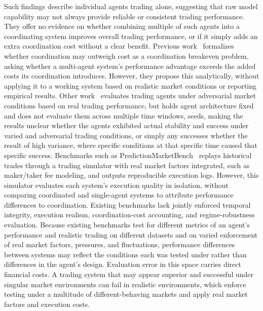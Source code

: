 \documentclass{article}
\begin{document}
Such findings describe individual agents trading alone, suggesting that raw model capability may not always provide reliable or consistent trading performance. They offer no evidence on whether combining multiple of such agents into a coordinating system improves overall trading performance, or if it simply adds an extra coordination cost without a clear benefit. Previous work~\cite{nguyen2026} formalizes whether coordination may outweigh cost as a coordination breakeven problem, asking whether a multi-agent system's performance advantage exceeds the added costs its coordination introduces. However, they propose this analytically, without applying it to a working system based on realistic market conditions or reporting empirical results. Other work~\cite{yuan2026traderbench} evaluates trading agents under adversarial market conditions based on real trading performance, but holds agent architecture fixed and does not evaluate them across multiple time windows, seeds, making the results unclear whether the agents exhibited actual stability and success under varied and adversarial trading conditions, or simply any successes whether the result of high variance, where specific conditions at that specific time caused that specific success. Benchmarks such as PredictionMarketBench~\cite{arora2026} replays historical trades through a trading simulator with real market factors integrated, such as maker/taker fee modeling, and outputs reproducible execution logs. However, this simulator evaluates each system's execution quality in isolation, without comparing coordinated and single-agent systems to attribute performance differences to coordination. Existing benchmarks lack jointly enforced temporal integrity, execution realism, coordination-cost accounting, and regime-robustness evaluation. Because existing benchmarks test for different metrics of an agent's performance and realistic trading on different datasets and on varied enforcement of real market factors, pressures, and fluctuations, performance differences between systems may reflect the conditions each was tested under rather than differences in the agent's design. Evaluation error in this space carries direct financial costs. A trading system that may appear superior and successful under singular market environments can fail in realistic environments, which enforce testing under a multitude of different-behaving markets and apply real market factors and execution costs.
\end{document}
